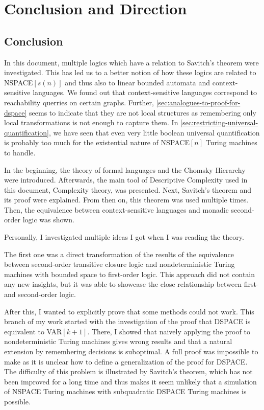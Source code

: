 
\chapter{Conclusion and Direction}\label{ch:conclusion-and-direction}

\section{Conclusion}\label{sec:conclusion}
In this document, multiple logics which have a relation to Savitch's theorem were investigated.
This has led us to a better notion of how these logics are related to NSPACE$[s(n)]$ and thus also to linear bounded automata and context-sensitive languages.
We found out that context-sensitive languages correspond to reachability querries on certain graphs.
Further, \cref{sec:analogues-to-proof-for-dspace} seems to indicate that they are not local structures as remembering only local transformations is not enough to capture them.
In \cref{sec:restricting-universal-quantification}, we have seen that even very little boolean universal quantification is probably too much for the existential nature of NSPACE$[n]$ Turing machines to handle.

In the beginning, the theory of formal languages and the Chomsky Hierarchy were introduced.
Afterwards, the main tool of Descriptive Complexity used in this document, Complexity theory, was presented.
Next, Savitch's theorem and its proof were explained.
From then on, this theorem was used multiple times.
Then, the equivalence between context-sensitive languages and monadic second-order logic was shown.

Personally, I investigated multiple ideas I got when I was reading the theory.

The first one was a direct transformation of the results of the equivalence between second-order transitive closure logic and nondeterministic Turing machines with bounded space to first-order logic.
This approach did not contain any new insights, but it was able to showcase the close relationship between first- and second-order logic.

After this, I wanted to explicitly prove that some methods could not work.
This branch of my work started with the investigation of the proof that DSPACE is equivalent to VAR$[k + 1]$.
There, I showed that naively applying the proof to nondeterministic Turing machines gives wrong results and that a natural extension by remembering decisions is suboptimal.
A full proof was impossible to make as it is unclear how to define a generalization of the proof for DSPACE\@.
The difficulty of this problem is illustrated by Savitch's theorem, which has not been improved for a long time and thus makes it seem unlikely that a simulation of NSPACE Turing machines with subquadratic DSPACE Turing machines is possible.

